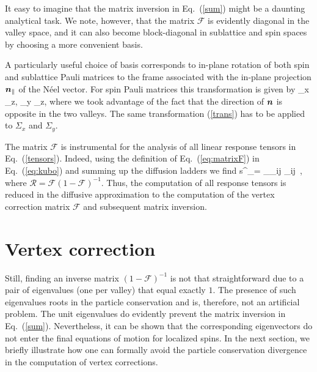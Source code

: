 It easy to imagine that the matrix inversion in Eq.~(\ref{sum}) might be a daunting analytical task. We note, however, that the matrix $\mathcal{F}$ is evidently diagonal in the valley space, and it can also become block-diagonal in sublattice and spin spaces by choosing a more convenient basis. 

A particularly useful choice of basis corresponds to in-plane rotation of both spin and sublattice Pauli matrices to the frame associated with the in-plane projection $\boldsymbol{n}_\parallel$ of the N\'eel vector. For spin Pauli matrices this transformation is given by
\be
\label{trans}
\sigma_x \rightarrow \Lambda_z, \quad \sigma_y \rightarrow \Lambda_z,
\e
where we took advantage of the fact that the direction of $\boldsymbol{n}$ is opposite in the two valleys. The same transformation (\ref{trans}) has to be applied to $\Sigma_{x}$ and $\Sigma_{y}$. 

The matrix $\mathcal{F}$ is instrumental for the analysis of all linear response tensors in Eq.~(\ref{tensors}). Indeed, using the definition of Eq.~(\ref{eq:matrixF}) in Eq.~(\ref{eq:kubo}) and summing up the diffusion ladders we find
\be
\label{final}
\delta s^\pm_\alpha = 
\s_\beta \s_{ij}  _{ij}  \,,
\e
where $\mathcal{R}=\mathcal{F}(1-\mathcal{F})^{-1}$. Thus, the computation of all response tensors is reduced in the diffusive approximation to the computation of the vertex correction matrix $\mathcal{F}$ and subsequent matrix inversion.  

\section{Vertex correction}\label{sec:appc}

Still, finding an inverse matrix $(1-\mathcal{F})^{-1}$ is not that straightforward due to a pair of eigenvalues (one per valley) that equal exactly $1$. The presence of such eigenvalues roots in the particle conservation and is, therefore, not an artificial problem. The unit eigenvalues do evidently prevent the matrix inversion in Eq.~(\ref{sum}). Nevertheless, it can be shown that the corresponding eigenvectors do not enter the final equations of motion for localized spins. In the next section, we briefly illustrate how one can formally avoid the particle conservation divergence in the computation of vertex corrections.

